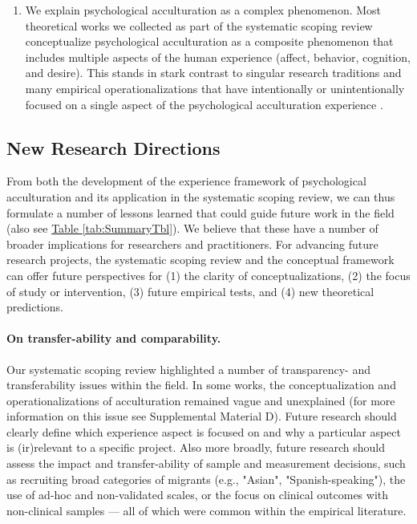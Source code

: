 \documentclass[man, 12pt, a4paper, mask]{apa7}
\newcommand{\tblref}[2][]{\hyperref[#2]{Table \ref*{#2}#1}}
\newcommand{\sicontext}{Supplemental Material D}
\begin{document}
\begin{enumerate}
\item We explain psychological acculturation as a complex phenomenon. Most theoretical works we collected as part of the systematic scoping review conceptualize psychological acculturation as a composite phenomenon that includes multiple aspects of the human experience (affect, behavior, cognition, and desire). This stands in stark contrast to singular research traditions and many empirical operationalizations that have intentionally or unintentionally focused on a single aspect of the psychological acculturation experience \citep[also see][]{Ward2001}.
\end{enumerate}

\subsection{New Research Directions}
From both the development of the experience framework of psychological acculturation and its application in the systematic scoping review, we can thus formulate a number of lessons learned that could guide future work in the field (also see \tblref{tab:SummaryTbl}). We believe that these have a number of broader implications for researchers and practitioners.
For advancing future research projects, the systematic scoping review and the conceptual framework can offer future perspectives for (1) the clarity of conceptualizations, (2) the focus of study or intervention, (3) future empirical tests, and (4) new theoretical predictions. 

\paragraph{On transfer-ability and comparability.} Our systematic scoping review highlighted a number of transparency- and transferability issues within the field. In some works, the conceptualization and operationalizations of acculturation remained vague and unexplained (for more information on this issue see \sicontext). Future research should clearly define which experience aspect is focused on and why a particular aspect is (ir)relevant to a specific project. Also more broadly, future research should assess the impact and transfer-ability of sample and measurement decisions, such as recruiting broad categories of migrants (e.g., "Asian", "Spanish-speaking"), the use of ad-hoc and non-validated scales, or the focus on clinical outcomes with non-clinical samples --- all of which were common within the empirical literature.
\end{document}
